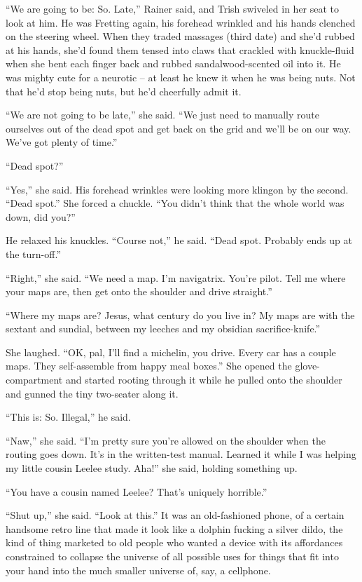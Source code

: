 “We are going to be: So. Late,” Rainer said, and Trish swiveled in 
her seat to look at him. He was Fretting again, his forehead wrinkled 
and his hands clenched on the steering wheel. When they traded massages 
(third date) and she'd rubbed at his hands, she'd found them tensed 
into claws that crackled with knuckle-fluid when she bent each finger 
back and rubbed sandalwood-scented oil into it. He was mighty cute for 
a neurotic -- at least he knew it when he was being nuts. Not that he'd 
stop being nuts, but he'd cheerfully admit it.

“We are not going to be late,” she said. “We just need to 
manually route ourselves out of the dead spot and get back on the grid 
and we'll be on our way. We've got plenty of time.”

“Dead spot?”

“Yes,” she said. His forehead wrinkles were looking more klingon by 
the second. “Dead spot.” She forced a chuckle. “You didn't think 
that the whole world was down, did you?”

He relaxed his knuckles. “Course not,” he said. “Dead spot. 
Probably ends up at the turn-off.”

“Right,” she said. “We need a map. I'm navigatrix. You're pilot. 
Tell me where your maps are, then get onto the shoulder and drive 
straight.”

“Where my maps are? Jesus, what century do you live in? My maps are 
with the sextant and sundial, between my leeches and my obsidian 
sacrifice-knife.”

She laughed. “OK, pal, I'll find a michelin, you drive. Every car has 
a couple maps. They self-assemble from happy meal boxes.” She opened 
the glove-compartment and started rooting through it while he pulled 
onto the shoulder and gunned the tiny two-seater along it.

“This is: So. Illegal,” he said.

“Naw,” she said. “I'm pretty sure you're allowed on the shoulder 
when the routing goes down. It's in the written-test manual. Learned it 
while I was helping my little cousin Leelee study. Aha!” she said, 
holding something up.

“You have a cousin named Leelee? That's uniquely horrible.”

“Shut up,” she said. “Look at this.” It was an old-fashioned 
phone, of a certain handsome retro line that made it look like a 
dolphin fucking a silver dildo, the kind of thing marketed to old 
people who wanted a device with its affordances constrained to collapse 
the universe of all possible uses for things that fit into your hand 
into the much smaller universe of, say, a cellphone.

